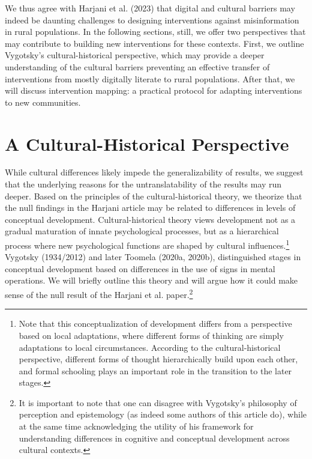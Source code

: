 \documentclass[authordate, empirical]{jote-new-article}
\begin{document}
	We thus agree with Harjani et al. (2023) that digital and cultural barriers may indeed be daunting challenges to designing interventions against misinformation in rural populations. In the following sections, still, we offer two perspectives that may contribute to building new interventions for these contexts. First, we outline Vygotsky's cultural-historical perspective, which may provide a deeper understanding of the cultural barriers preventing an effective transfer of interventions from mostly digitally literate to rural populations. After that, we will discuss intervention mapping: a practical protocol for adapting interventions to new communities.



	\section{A Cultural-Historical Perspective}



	While cultural differences likely impede the generalizability of results, we suggest that the underlying reasons for the untranslatability of the results may run deeper. Based on the principles of the cultural-historical theory, we theorize that the null findings in the Harjani article may be related to differences in levels of conceptual development. Cultural-historical theory views development not as a gradual maturation of innate psychological processes, but as a hierarchical process where new psychological functions are shaped by cultural influences.\footnote{Note that this conceptualization of development differs from a perspective based on local adaptations, where different forms of thinking are simply adaptations to local circumstances. According to the cultural-historical perspective, different forms of thought hierarchically build upon each other, and formal schooling plays an important role in the transition to the later stages.} Vygotsky (1934/2012) and later Toomela (2020a, 2020b), distinguished stages in conceptual development based on differences in the use of signs in mental operations. We will briefly outline this theory and will argue how it could make sense of the null result of the Harjani et al. paper.\footnote{It is important to note that one can disagree with Vygotsky's philosophy of perception and epistemology (as indeed some authors of this article do), while at the same time acknowledging the utility of his framework for understanding differences in cognitive and conceptual development across cultural contexts.}
\end{document}
